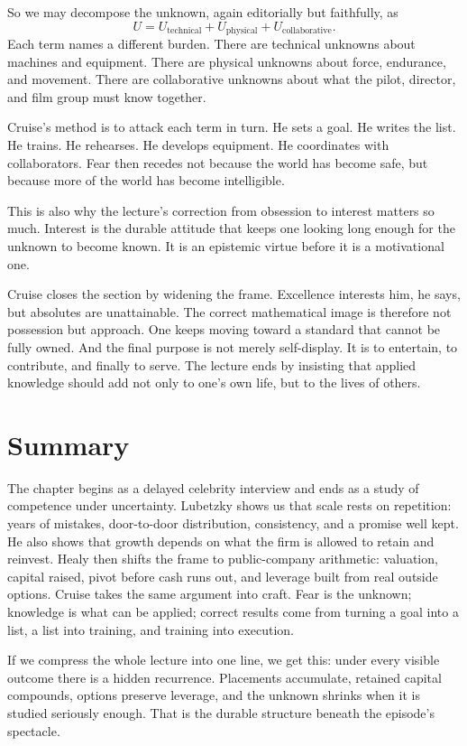So we may decompose the unknown, again editorially but faithfully, as
\begin{equation}
U = U_{\mathrm{technical}} + U_{\mathrm{physical}} + U_{\mathrm{collaborative}}.
\end{equation}
Each term names a different burden. There are technical unknowns about machines and equipment. There are physical unknowns about force, endurance, and movement. There are collaborative unknowns about what the pilot, director, and film group must know together.

Cruise's method is to attack each term in turn. He sets a goal. He writes the list. He trains. He rehearses. He develops equipment. He coordinates with collaborators. Fear then recedes not because the world has become safe, but because more of the world has become intelligible.

This is also why the lecture's correction from obsession to interest matters so much. Interest is the durable attitude that keeps one looking long enough for the unknown to become known. It is an epistemic virtue before it is a motivational one.

Cruise closes the section by widening the frame. Excellence interests him, he says, but absolutes are unattainable. The correct mathematical image is therefore not possession but approach. One keeps moving toward a standard that cannot be fully owned. And the final purpose is not merely self-display. It is to entertain, to contribute, and finally to serve. The lecture ends by insisting that applied knowledge should add not only to one's own life, but to the lives of others.

\section{Summary}

The chapter begins as a delayed celebrity interview and ends as a study of competence under uncertainty. Lubetzky shows us that scale rests on repetition: years of mistakes, door-to-door distribution, consistency, and a promise well kept. He also shows that growth depends on what the firm is allowed to retain and reinvest. Healy then shifts the frame to public-company arithmetic: valuation, capital raised, pivot before cash runs out, and leverage built from real outside options. Cruise takes the same argument into craft. Fear is the unknown; knowledge is what can be applied; correct results come from turning a goal into a list, a list into training, and training into execution.

If we compress the whole lecture into one line, we get this: under every visible outcome there is a hidden recurrence. Placements accumulate, retained capital compounds, options preserve leverage, and the unknown shrinks when it is studied seriously enough. That is the durable structure beneath the episode's spectacle.